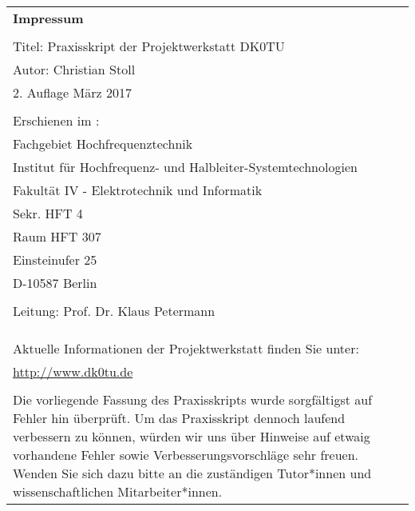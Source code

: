 \thispagestyle{empty}

\begin{tabular}{p{13cm} p{1cm}}
\textbf{Impressum} &\\
&\\
Titel: Praxisskript der Projektwerkstatt DK0TU&\\
Autor: Christian Stoll&\\
2. Auflage März 2017 &\\
&\\
Erschienen im :&\\
Fachgebiet Hochfrequenztechnik &\\
Institut für Hochfrequenz- und Halbleiter-Systemtechnologien&\\
Fakultät IV - Elektrotechnik und Informatik &\\
Sekr. HFT 4 &\\
Raum HFT 307 &\\
Einsteinufer 25 &\\
D-10587 Berlin &\\
&\\
Leitung: Prof. Dr. Klaus Petermann &\\
&\\
&\\
&\\
Aktuelle Informationen der Projektwerkstatt finden Sie unter:  &\\
\url{http://www.dk0tu.de} &\\
&\\
Die vorliegende Fassung des Praxisskripts wurde sorgfältigst auf Fehler hin überprüft. Um das Praxisskript dennoch laufend verbessern zu können, würden wir uns über Hinweise auf etwaig vorhandene Fehler sowie Verbesserungsvorschläge sehr freuen. Wenden Sie sich dazu bitte an die zuständigen Tutor*innen und wissenschaftlichen Mitarbeiter*innen.&\\
\end{tabular}



